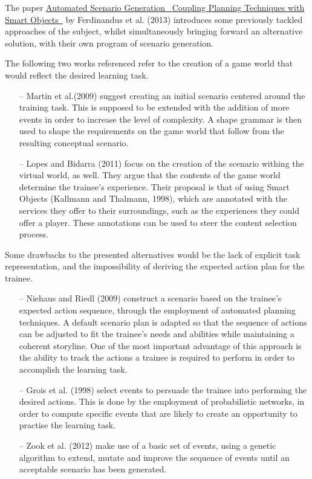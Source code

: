 \documentclass[a4paper,12pt]{report}
\begin{document}
The paper \href{http://mariekepeeters.com/wp-content/uploads/2013/11/Ferdinandus-CSEDU2013-Automated-Scenario-Generation.pdf}{Automated Scenario Generation ~Coupling Planning Techniques with Smart Objects~}
  by Ferdinandus et al. (2013) introduces some previously tackled approaches of the subject, whilst simultaneously bringing forward an alternative solution, with their own program of scenario generation.

The following two works referenced refer to the creation of a game world that would reflect the desired learning task.
\begin{itemize}
\item[--] Martin et al.(2009) \cite{martin_2009} suggest creating an initial scenario centered around the training task. 
This is supposed to be extended with the addition of more events in order to increase the level of complexity. 
A shape grammar is then used to shape the requirements on the game world that follow from the resulting conceptual scenario.
\item[--] Lopes and Bidarra (2011) \cite{lopes_bidarra} focus on the creation of the scenario withing the virtual world, as well. 
They argue that the contents of the game world determine the trainee's experience.
Their proposal is that of using Smart Objects (Kallmann and Thalmann, 1998), which are annotated with the services they offer to their surroundings, such as the experiences they could offer a player.
These annotations can be used to steer the content selection process.
\end{itemize}

Some drawbacks to the presented alternatives would be the lack of explicit task representation, and the impossibility of deriving the expected action plan for the trainee.

\begin{itemize}
\item[--] Niehaus and Riedl (2009) \cite{niehaus_riedl} construct a scenario based on the trainee's expected action sequence, through the employment of automated planning techniques.
A default scenario plan is adapted so that the sequence of actions can be adjusted to fit the trainee's needs and abilities while maintaining a coherent storyline.
One of the most important advantage of this approach is the ability to track the actions a trainee is required to perform in order to accomplish the learning task.
\item[--] Grois et al. (1998) \cite{grois_1998} select events to persuade the trainee into performing the desired actions.
This is done by the employment of probabilistic networks, in order to compute specific events that are likely to create an opportunity to practise the learning task.
\item[--] Zook et al. (2012) \cite{zook_2012} make use of a basic set of events, using a genetic algorithm to extend, mutate and improve the sequence of events until an acceptable scenario has been generated.
\end{itemize}
\end{document}
